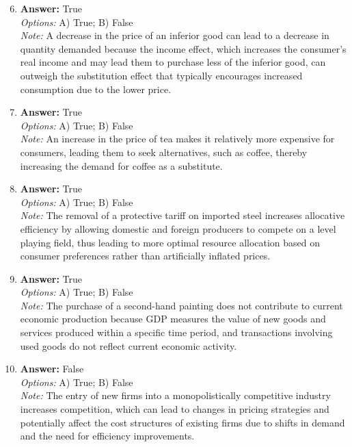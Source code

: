 \documentclass[12pt]{article}
\begin{document}
\begin{enumerate}[label=\arabic*.]
\setcounter{enumi}{5}
\item \textbf{Answer:} True
\\ \textit{Options:} A) True; B) False
\\ \textit{Note:} A decrease in the price of an inferior good can lead to a decrease in quantity demanded because the income effect, which increases the consumer's real income and may lead them to purchase less of the inferior good, can outweigh the substitution effect that typically encourages increased consumption due to the lower price.
\item \textbf{Answer:} True
\\ \textit{Options:} A) True; B) False
\\ \textit{Note:} An increase in the price of tea makes it relatively more expensive for consumers, leading them to seek alternatives, such as coffee, thereby increasing the demand for coffee as a substitute.
\item \textbf{Answer:} True
\\ \textit{Options:} A) True; B) False
\\ \textit{Note:} The removal of a protective tariff on imported steel increases allocative efficiency by allowing domestic and foreign producers to compete on a level playing field, thus leading to more optimal resource allocation based on consumer preferences rather than artificially inflated prices.
\item \textbf{Answer:} True
\\ \textit{Options:} A) True; B) False
\\ \textit{Note:} The purchase of a second-hand painting does not contribute to current economic production because GDP measures the value of new goods and services produced within a specific time period, and transactions involving used goods do not reflect current economic activity.
\item \textbf{Answer:} False
\\ \textit{Options:} A) True; B) False
\\ \textit{Note:} The entry of new firms into a monopolistically competitive industry increases competition, which can lead to changes in pricing strategies and potentially affect the cost structures of existing firms due to shifts in demand and the need for efficiency improvements.
\end{enumerate}
\end{document}
